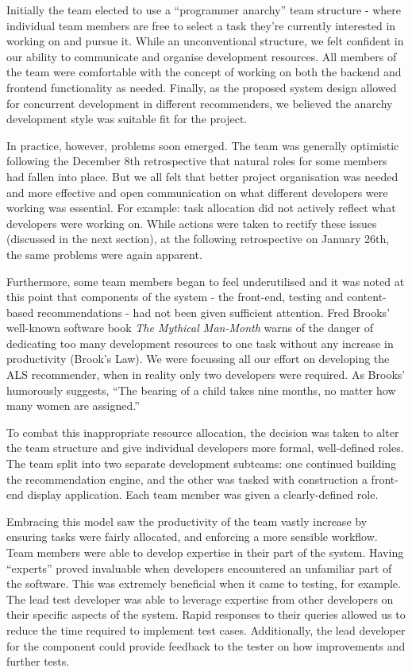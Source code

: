 \documentclass{l3proj}
\begin{document}
Initially the team elected to use a “programmer anarchy” team structure - where individual team members are free to select a task they’re currently interested in working on and pursue it. While an unconventional structure, we felt confident in our ability to communicate and organise development resources. All members of the team were comfortable with the concept of working on both the backend and frontend functionality as needed. Finally, as the proposed system design allowed for concurrent development in different recommenders, we believed the anarchy development style was suitable fit for the project. 

In practice, however, problems soon emerged. The team was generally optimistic following the December 8th retrospective that natural roles for some members had fallen into place. But we all felt that better project organisation was needed and more effective and open communication on what different developers were working was essential. For example: task allocation did not actively reflect what developers were working on. While actions were taken to rectify these issues (discussed in the next section), at the following retrospective on January 26th, the same problems were again apparent. 

Furthermore, some team members began to feel underutilised and it was noted at this point that components of the system - the front-end, testing and content-based recommendations - had not been given sufficient attention. Fred Brooks' well-known software book \textit{The Mythical Man-Month} warns of the danger of dedicating too many development resources to one task without any increase in productivity (Brook’s Law). We were focussing all our effort on developing the ALS recommender, when in reality only two developers were required. As Brooks’ humorously suggests, “The bearing of a child takes nine months, no matter how many women are assigned.”

To combat this inappropriate resource allocation, the decision was taken to alter the team structure and give individual developers more formal, well-defined roles. The team split into two separate development subteams: one continued building the recommendation engine, and the other was tasked with construction a front-end display application. Each team member was given a clearly-defined role. 

Embracing this model saw the productivity of the team vastly increase by ensuring tasks were fairly allocated, and enforcing a more sensible workflow. Team members were able to develop expertise in their part of the system. Having “experts” proved invaluable when developers encountered an unfamiliar part of the software. This was extremely beneficial when it came to testing, for example. The lead test developer was able to leverage expertise from other developers on their specific aspects of the system. Rapid responses to their queries allowed us to reduce the time required to implement test cases. Additionally, the lead developer for the component could provide feedback to the tester on how improvements and further tests.
\end{document}

